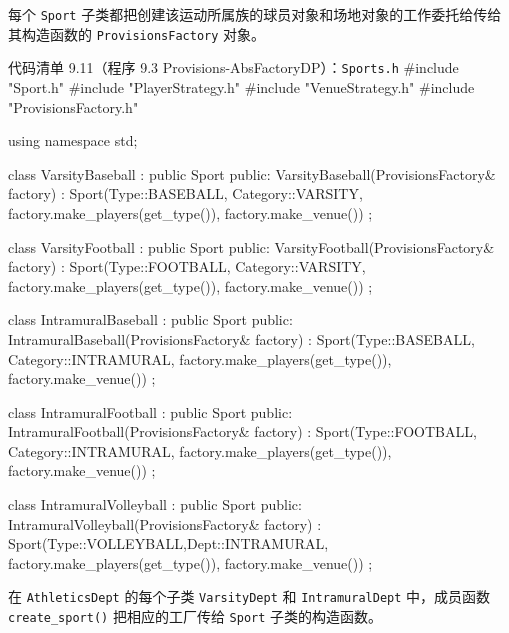 每个 \texttt{Sport} 子类都把创建该运动所属族的球员对象和场地对象的工作委托给传给其构造函数的 \texttt{Provisions\allowbreak{}Factory} 对象。

\begin{codeboxt}{代码清单 9.11（程序 9.3 Provisions-AbsFactoryDP）：\texttt{Sports.h}}
#include "Sport.h"
#include "PlayerStrategy.h"
#include "VenueStrategy.h"
#include "ProvisionsFactory.h"

using namespace std;

class VarsityBaseball : public Sport
{
public:
    VarsityBaseball(ProvisionsFactory& factory)
        : Sport(Type::BASEBALL, Category::VARSITY,
                factory.make_players(get_type()),
                factory.make_venue()) {}
};

class VarsityFootball : public Sport
{
public:
    VarsityFootball(ProvisionsFactory& factory)
        : Sport(Type::FOOTBALL, Category::VARSITY,
                factory.make_players(get_type()),
                factory.make_venue()) {}
};

class IntramuralBaseball : public Sport
{
public:
    IntramuralBaseball(ProvisionsFactory& factory)
        : Sport(Type::BASEBALL, Category::INTRAMURAL,
                factory.make_players(get_type()),
                factory.make_venue()) {}
};

class IntramuralFootball : public Sport
{
public:
    IntramuralFootball(ProvisionsFactory& factory)
        : Sport(Type::FOOTBALL, Category::INTRAMURAL,
                factory.make_players(get_type()),
                factory.make_venue()) {}
};

class IntramuralVolleyball : public Sport
{
public:
    IntramuralVolleyball(ProvisionsFactory& factory)
        : Sport(Type::VOLLEYBALL,Dept::INTRAMURAL,
                factory.make_players(get_type()),
                factory.make_venue()) {}
};
\end{codeboxt}

在 \texttt{Athletics\allowbreak{}Dept} 的每个子类 \texttt{Varsity\allowbreak{}Dept} 和 \texttt{Intramural\allowbreak{}Dept} 中，成员函数 \texttt{create\_\allowbreak{}sport(\allowbreak{})\allowbreak{}} 把相应的工厂传给 \texttt{Sport} 子类的构造函数。

